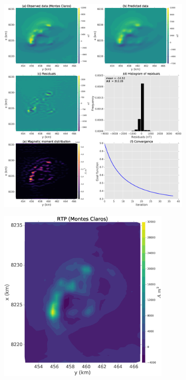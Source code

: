 \begin{figure}
	\centering
	\includegraphics[width=0.85\textwidth]{Fig/field_data_montes_claros/montes_claros_compiled_LM_NNLS_magRM.eps}
	\caption{}
	\label{fig:mc_data_application}
\end{figure}

\begin{figure}
	\centering
	\includegraphics[width=0.75\textwidth]{Fig/field_data_montes_claros/RTP_data_montes_claros.eps}
	\caption{}
	\label{fig:rtp_mc_data}
\end{figure}
